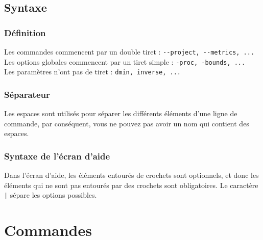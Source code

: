 \documentclass{report}
\begin{document}
\subsection{Syntaxe}
\subsubsection{Définition}
Les commandes commencent par un double tiret : \verb|--project, --metrics, ...|\\
Les options globales commencent par un tiret simple : \verb|-proc, -bounds, ...|\\
Les paramètres n'ont pas de tiret : \verb|dmin, inverse, ...|

\subsubsection{Séparateur}
Les espaces sont utilisés pour séparer les différents éléments d'une ligne de commande, par conséquent, vous ne pouvez pas avoir un nom qui contient des espaces.\\

\subsubsection{Syntaxe de l'écran d'aide}
Dans l'écran d'aide, les éléments entourés de crochets sont optionnels, et donc les éléments qui ne sont pas entourés par des crochets sont obligatoires. Le caractère \verb+|+ sépare les options possibles.

\section{Commandes}
\end{document}
